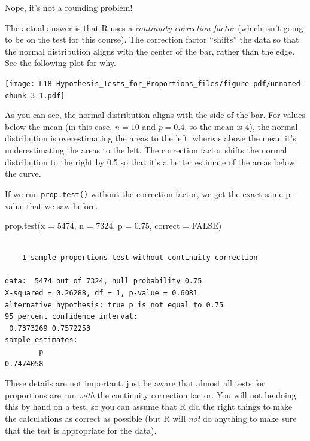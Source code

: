 \documentclass[
  letterpaper,
  DIV=11,
  numbers=noendperiod,
  oneside]{scrreprt}
\newenvironment{Shaded}{\begin{snugshade}}{\end{snugshade}}
\newcommand{\AttributeTok}[1]{\textcolor[rgb]{0.40,0.45,0.13}{#1}}
\newcommand{\ConstantTok}[1]{\textcolor[rgb]{0.56,0.35,0.01}{#1}}
\newcommand{\DecValTok}[1]{\textcolor[rgb]{0.68,0.00,0.00}{#1}}
\newcommand{\FloatTok}[1]{\textcolor[rgb]{0.68,0.00,0.00}{#1}}
\newcommand{\FunctionTok}[1]{\textcolor[rgb]{0.28,0.35,0.67}{#1}}
\newcommand{\NormalTok}[1]{\textcolor[rgb]{0.00,0.23,0.31}{#1}}
\begin{document}
Nope, it's not a rounding problem!

The actual answer is that R uses a \emph{continuity correction factor}
(which isn't going to be on the test for this course). The correction
factor ``shifts'' the data so that the normal distribution aligns with
the center of the bar, rather than the edge. See the following plot for
why.

\texttt{[image: L18-Hypothesis\_Tests\_for\_Proportions\_files/figure-pdf/unnamed-chunk-3-1.pdf]}

As you can see, the normal distribution aligns with the side of the bar.
For values below the mean (in this case, \(n=10\) and \(p=0.4\), so the
mean is 4), the normal distribution is overestimating the areas to the
left, whereas above the mean it's underestimating the areas to the left.
The correction factor shifts the normal distribution to the right by 0.5
so that it's a better estimate of the areas below the curve.

If we run \texttt{prop.test()} without the correction factor, we get the
exact same p-value that we saw before.

\begin{Shaded}
\begin{Highlighting}[]
\FunctionTok{prop.test}\NormalTok{(}\AttributeTok{x =} \DecValTok{5474}\NormalTok{, }\AttributeTok{n =} \DecValTok{7324}\NormalTok{, }\AttributeTok{p =} \FloatTok{0.75}\NormalTok{, }\AttributeTok{correct =} \ConstantTok{FALSE}\NormalTok{)}
\end{Highlighting}
\end{Shaded}

\begin{verbatim}

    1-sample proportions test without continuity correction

data:  5474 out of 7324, null probability 0.75
X-squared = 0.26288, df = 1, p-value = 0.6081
alternative hypothesis: true p is not equal to 0.75
95 percent confidence interval:
 0.7373269 0.7572253
sample estimates:
        p 
0.7474058 
\end{verbatim}

These details are not important, just be aware that almost all tests for
proportions are run \emph{with} the continuity correction factor. You
will not be doing this by hand on a test, so you can assume that R did
the right things to make the calculations as correct as possible (but R
will \emph{not} do anything to make sure that the test is appropriate
for the data).
\end{document}
